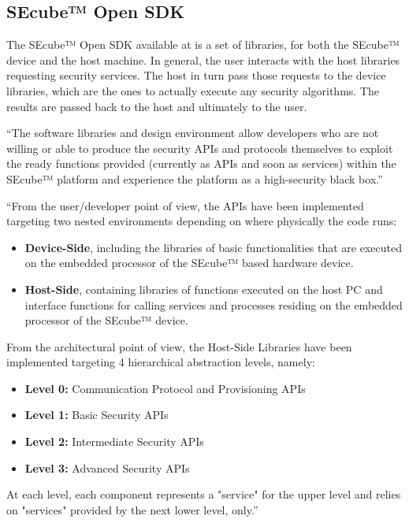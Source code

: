 \subsection{SEcube™ Open SDK}

The SEcube™ Open SDK available at \cite{SEcubeRes} is a set of libraries, for both the SEcube™ device and the host machine. In general, the user interacts with the host libraries requesting security services. The host in turn pass those requests to the device libraries, which are the ones to actually execute any security algorithms. The results are passed back to the host and ultimately to the user.

``The software libraries and design environment allow developers who are not willing or able to produce the security APIs and protocols themselves to exploit the ready functions provided (currently as APIs and soon as services) within the SEcube™ platform and experience the platform as a high-security black box.'' \cite{L2UserMan}

``From the user/developer point of view, the APIs have been implemented targeting two
nested environments depending on where physically the code runs:
\begin{itemize}
\setlength\itemsep{1pt}
\item \textbf{Device-Side}, including the libraries of basic functionalities that are executed on the embedded processor of the SEcube™ based hardware device.
\item \textbf{Host-Side}, containing libraries of functions executed on the host PC and interface functions for calling services and processes residing on the embedded processor of the SEcube™ device.
\end{itemize} 

From the architectural point of view, the Host-Side Libraries have been implemented targeting 4 hierarchical abstraction levels, namely:
\begin{itemize}
\setlength\itemsep{-3pt}
\item \textbf{Level 0:} Communication Protocol and Provisioning APIs
\item \textbf{Level 1:} Basic Security APIs
\item \textbf{Level 2:} Intermediate Security APIs
\item \textbf{Level 3:} Advanced Security APIs
\end{itemize}

At each level, each component represents a "service" for the upper level and relies on "services" provided by the next lower level, only.'' \cite{L2UserMan}

